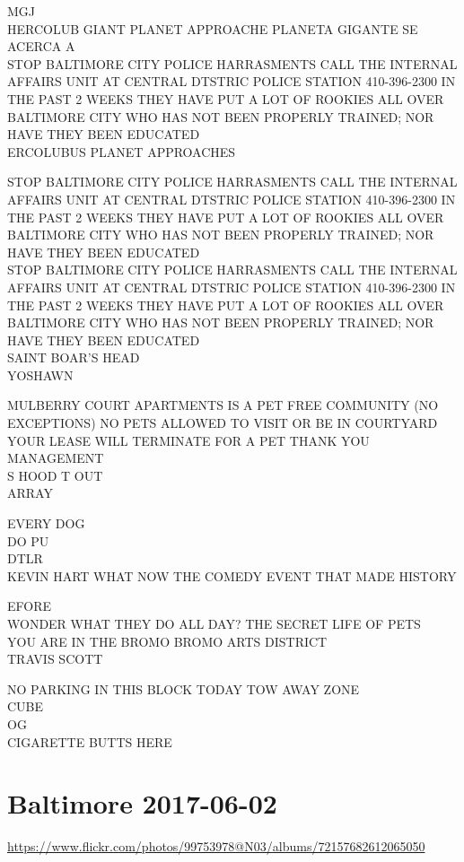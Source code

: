\documentclass[10pt,letterpaper]{article}
\begin{document}
MGJ\\
HERCOLUB GIANT PLANET APPROACHE PLANETA GIGANTE SE ACERCA A\\
STOP BALTIMORE CITY POLICE HARRASMENTS CALL THE INTERNAL AFFAIRS UNIT AT CENTRAL DTSTRIC POLICE STATION 410{-}396{-}2300 IN THE PAST 2 WEEKS THEY HAVE PUT A LOT OF ROOKIES ALL OVER BALTIMORE CITY WHO HAS NOT BEEN PROPERLY TRAINED; NOR HAVE THEY BEEN EDUCATED\\
ERCOLUBUS PLANET APPROACHES

STOP BALTIMORE CITY POLICE HARRASMENTS CALL THE INTERNAL AFFAIRS UNIT AT CENTRAL DTSTRIC POLICE STATION 410{-}396{-}2300 IN THE PAST 2 WEEKS THEY HAVE PUT A LOT OF ROOKIES ALL OVER BALTIMORE CITY WHO HAS NOT BEEN PROPERLY TRAINED; NOR HAVE THEY BEEN EDUCATED\\
STOP BALTIMORE CITY POLICE HARRASMENTS CALL THE INTERNAL AFFAIRS UNIT AT CENTRAL DTSTRIC POLICE STATION 410{-}396{-}2300 IN THE PAST 2 WEEKS THEY HAVE PUT A LOT OF ROOKIES ALL OVER BALTIMORE CITY WHO HAS NOT BEEN PROPERLY TRAINED; NOR HAVE THEY BEEN EDUCATED\\
SAINT BOAR'S HEAD\\
YOSHAWN

MULBERRY COURT APARTMENTS IS A PET FREE COMMUNITY (NO EXCEPTIONS) NO PETS ALLOWED TO VISIT OR BE IN COURTYARD YOUR LEASE WILL TERMINATE FOR A PET THANK YOU MANAGEMENT\\
S HOOD T OUT\\
ARRAY

EVERY DOG\\
DO PU\\
DTLR\\
KEVIN HART WHAT NOW THE COMEDY EVENT THAT MADE HISTORY

EFORE\\
WONDER WHAT THEY DO ALL DAY?  THE SECRET LIFE OF PETS\\
YOU ARE IN THE BROMO BROMO ARTS DISTRICT\\
TRAVIS SCOTT

NO PARKING IN THIS BLOCK TODAY TOW AWAY ZONE\\
CUBE\\
OG\\
CIGARETTE BUTTS HERE
\pagebreak

\section*{Baltimore 2017-06-02}

\url{https://www.flickr.com/photos/99753978@N03/albums/72157682612065050}
\end{document}
